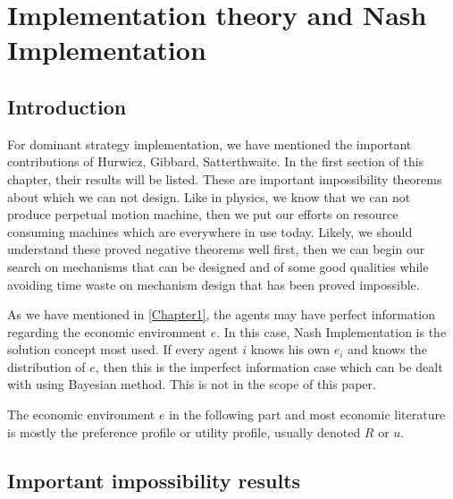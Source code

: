 
\chapter{Implementation theory and Nash Implementation  }  %

\label{Chapter2} %




\section{Introduction}
For dominant strategy implementation, we have mentioned the important
contributions of Hurwicz, Gibbard, Satterthwaite. In the first section
of this chapter, their results will be listed. These are
important impossibility theorems about which we can not design. Like
in physics, we know that we can not produce perpetual motion machine,
then we put our efforts on resource consuming machines which are
everywhere in use today. Likely, we should understand these proved
negative theorems well first, then we can begin our search on
mechanisms that can be designed and of some good qualities while
avoiding time waste on mechanism design that has been proved impossible.


As we have mentioned in \ref{Chapter1}, the agents may have perfect
information regarding the economic environment $e$. In this case, Nash
Implementation is the solution concept most used.
If every agent $i$ knows his own $e_i$ and
knows the distribution of $e$, then this is the imperfect information
case which can be dealt with using Bayesian method.  This is not in the scope of this paper.

The economic environment $e$ in the following part and most economic literature is mostly the preference profile or utility profile, usually denoted $R$ or $u$.
\section{Important impossibility results}


